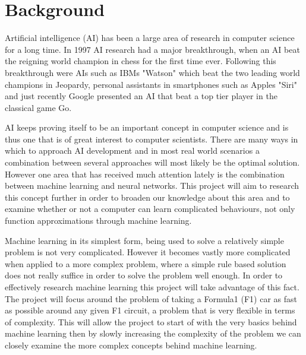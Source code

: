 \chapter{Background}


Artificial intelligence (AI) has been a large area of research in computer science for a long time. In 1997 AI research had a major breakthrough, when an AI beat the reigning world champion in chess for the first time ever. Following this breakthrough were AIs such as IBMs "Watson" which beat the two leading world champions in Jeopardy, personal assistants in smartphones such as Apples "Siri" and just recently Google presented an AI that beat a top tier player in the classical game Go.


AI keeps proving itself to be an important concept in computer science and is thus one that is of great interest to computer scientists. There are many ways in which to approach AI development and in most real world scenarios a combination between several approaches will most likely be the optimal solution. However one area that has received much attention lately is the combination between machine learning and neural networks. This project will aim to research this concept further in order to broaden our knowledge about this area and to examine whether or not a computer can learn complicated behaviours, not only function approximations through machine learning. %

Machine learning in its simplest form, being used to solve a relatively simple problem is not very complicated. However it becomes vastly more complicated when applied to a more complex problem, where a simple rule based solution does not really suffice in order to solve the problem well enough. In order to effectively research machine learning this project will take advantage of this fact. The project will focus around the problem of taking a Formula1 (F1) car as fast as possible around any given F1 circuit, a problem that is very flexible in terms of complexity. This will allow the project to start of with the very basics behind machine learning then by slowly increasing the complexity of the problem we can closely examine the more complex concepts behind machine learning.

